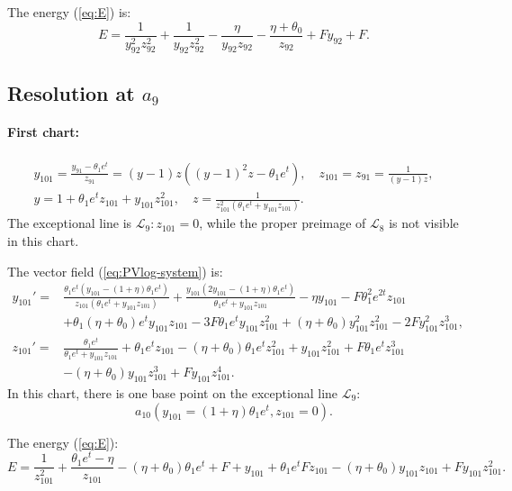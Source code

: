 The energy (\ref{eq:E}) is:
$$
E=
\frac{1}{y_{92}^2 z_{92}^2}
+\frac{1}{y_{92} z_{92}^2}
-\frac{\eta}{y_{92} z_{92}}
-\frac{\eta+\theta_0}{z_{92}}
+F y_{92}
+F
.
$$

\subsection{Resolution at $a_9$}\label{a9-blow}
\paragraph{First chart:}
\begin{gather*}
y_{101}=\frac{y_{91}-\theta_1e^t}{z_{91}}= (y-1)z ( (y-1)^2z - \theta_1 e^t ),
\quad
z_{101}=z_{91}=\frac1{(y-1)z},
\\
y=1 + \theta_1e^t z_{101} + y_{101} z_{101}^2,
\quad
z=\frac{1}{z_{101}^2 (\theta_1e^t + y_{101} z_{101})}.
\end{gather*}
The exceptional line is $\mathcal{L}_9 : z_{101}=0$, while the proper preimage of $\mathcal{L}_{8}$ is not visible in this chart. 

The vector field  (\ref{eq:PVlog-system}) is:
$$
\begin{aligned}
y_{101}'=&
\frac{\theta_1 e^t  (y_{101}-(1 + \eta)\theta_1  e^t )}{z_{101} (\theta_1 e^t  + y_{101} z_{101})}
+
\frac{y_{101} (2y_{101}-(1 + \eta)  \theta_1 e^t)}{\theta_1 e^t  + y_{101} z_{101}}
-\eta y_{101}   - F\theta_1^2 e^{2t} z_{101}
\\
&
+\theta_1(\eta+\theta_0) e^t y_{101} z_{101}
-3F\theta_1 e^ty_{101}z_{101}^2 + (\eta+\theta_0) y_{101}^2 z_{101}^2 - 2 F y_{101}^2 z_{101}^3
,\\
z_{101}'=&
\frac{\theta_1 e^t}{\theta_1 e^t  + y_{101} z_{101}}
+
\theta_1 e^t z_{101} - (\eta +\theta_0) \theta_1 e^t z_{101}^2 + 
 y_{101} z_{101}^2 +  F\theta_1 e^t z_{101}^3
\\& 
   - (\eta +\theta_0) y_{101} z_{101}^3 + F y_{101} z_{101}^4
 .
\end{aligned}
$$
In this chart, there is one base point on the exceptional line $\mathcal{L}_9$:
$$
a_{10}\left(y_{101}=(1 + \eta)\theta_1  e^t,z_{101}=0\right).
$$

The energy (\ref{eq:E}):
$$
E=
\frac{1}{z_{101}^2}
+\frac{\theta_1 e^t-\eta}{z_{101}}
-(\eta+\theta_0) \theta_1 e^t
+F
+y_{101}
+\theta_1 e^t F  z_{101}
-(\eta+\theta_0) y_{101} z_{101}
+F y_{101} z_{101}^2
.
$$

